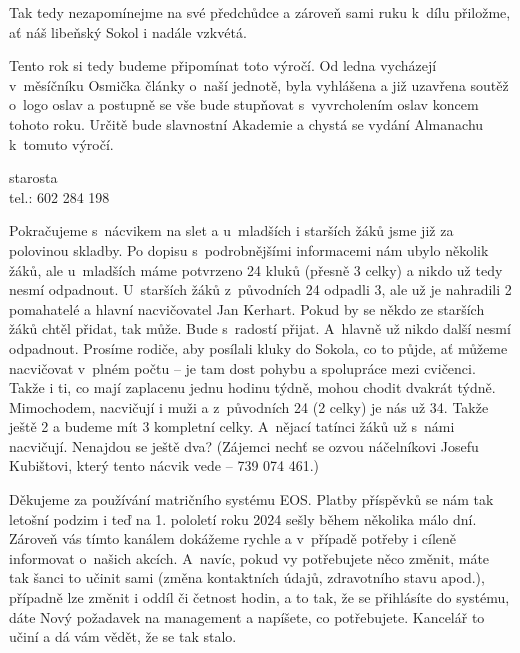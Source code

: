 \documentclass[11pt]{article}
\begin{document}
\vspace*{12pt}
\normalfont

Tak tedy nezapomínejme na své předchůdce a zároveň sami ruku k~dílu přiložme, ať náš libeňský Sokol i nadále vzkvétá.

Tento rok si tedy budeme připomínat toto výročí. Od ledna vycházejí v~měsíčníku Osmička články o~naší jednotě, byla vyhlášena a již uzavřena soutěž o~logo oslav a postupně se vše bude stupňovat s~vyvrcholením oslav koncem tohoto roku. Určitě bude slavnostní Akademie a chystá se vydání Almanachu k~tomuto výročí.  

\signature{Jiří Novák (Jirkan)}{starosta\\tel.: 602 284 198}

\vspace*{24pt}

Pokračujeme s~nácvikem na slet a u~mladších i starších žáků jsme již za polovinou skladby. Po dopisu s~podrobnějšími informacemi nám ubylo několik žáků, ale u~mladších máme potvrzeno 24 kluků (přesně 3 celky) a nikdo už tedy nesmí odpadnout. U~starších žáků z~původních 24 odpadli 3, ale už je nahradili 2 pomahatelé a hlavní nacvičovatel Jan Kerhart. Pokud by se někdo ze starších žáků chtěl přidat, tak může. Bude s~radostí přijat. A~hlavně už nikdo další nesmí odpadnout. Prosíme rodiče, aby posílali kluky do Sokola, co to půjde, ať můžeme nacvičovat v~plném počtu – je tam dost pohybu a spolupráce mezi cvičenci. Takže i ti, co mají zaplacenu jednu hodinu týdně, mohou chodit dvakrát týdně.
Mimochodem, nacvičují i muži a z~původních 24 (2 celky) je nás už 34. Takže ještě 2 a budeme mít 3 kompletní celky. A~nějací tatínci žáků už s~námi nacvičují. Nenajdou se ještě dva? (Zájemci nechť se ozvou náčelníkovi Josefu Kubištovi, který tento nácvik vede – 739 074 461.)

\clearpage

Děkujeme za používání matričního systému EOS. Platby příspěvků se nám tak letošní podzim i teď na 1. pololetí roku 2024 sešly během několika málo dní. Zároveň vás tímto kanálem dokážeme rychle a v~případě potřeby i cíleně informovat o~našich akcích. A~navíc, pokud vy potřebujete něco změnit, máte tak šanci to učinit sami (změna kontaktních údajů, zdravotního stavu apod.), případně lze změnit i oddíl či četnost hodin, a to tak, že se přihlásíte do systému, dáte \luv{}Nový požadavek na management\ruv{} a napíšete, co potřebujete. Kancelář to učiní a dá vám vědět, že se tak stalo. 
\end{document}
